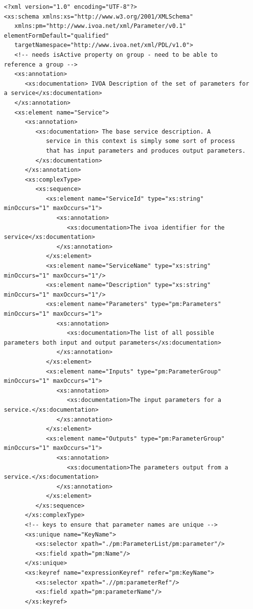 \documentclass[a4paper,11pt] {ivoa}
\begin{document}
\begin{lstlisting}[style=listXML]
<?xml version="1.0" encoding="UTF-8"?>
<xs:schema xmlns:xs="http://www.w3.org/2001/XMLSchema"
   xmlns:pm="http://www.ivoa.net/xml/Parameter/v0.1" elementFormDefault="qualified"
   targetNamespace="http://www.ivoa.net/xml/PDL/v1.0">
   <!-- needs isActive property on group - need to be able to reference a group -->
   <xs:annotation>
      <xs:documentation> IVOA Description of the set of parameters for a service</xs:documentation>
   </xs:annotation>
   <xs:element name="Service">
      <xs:annotation>
         <xs:documentation> The base service description. A
            service in this context is simply some sort of process
            that has input parameters and produces output parameters.
         </xs:documentation>
      </xs:annotation>
      <xs:complexType>
         <xs:sequence>
            <xs:element name="ServiceId" type="xs:string" minOccurs="1" maxOccurs="1">
               <xs:annotation>
                  <xs:documentation>The ivoa identifier for the service</xs:documentation>
               </xs:annotation>
            </xs:element>
            <xs:element name="ServiceName" type="xs:string" minOccurs="1" maxOccurs="1"/>
            <xs:element name="Description" type="xs:string" minOccurs="1" maxOccurs="1"/>
            <xs:element name="Parameters" type="pm:Parameters" minOccurs="1" maxOccurs="1">
               <xs:annotation>
                  <xs:documentation>The list of all possible parameters both input and output parameters</xs:documentation>
               </xs:annotation>
            </xs:element>
            <xs:element name="Inputs" type="pm:ParameterGroup" minOccurs="1" maxOccurs="1">
               <xs:annotation>
                  <xs:documentation>The input parameters for a service.</xs:documentation>
               </xs:annotation>
            </xs:element>
            <xs:element name="Outputs" type="pm:ParameterGroup" minOccurs="1" maxOccurs="1">
               <xs:annotation>
                  <xs:documentation>The parameters output from a service.</xs:documentation>
               </xs:annotation>
            </xs:element>
         </xs:sequence>
      </xs:complexType>
      <!-- keys to ensure that parameter names are unique -->
      <xs:unique name="KeyName">
         <xs:selector xpath="./pm:ParameterList/pm:parameter"/>
         <xs:field xpath="pm:Name"/>
      </xs:unique>
      <xs:keyref name="expressionKeyref" refer="pm:KeyName">
         <xs:selector xpath=".//pm:parameterRef"/>
         <xs:field xpath="pm:parameterName"/>
      </xs:keyref>


\end{lstlisting}
\end{document}
